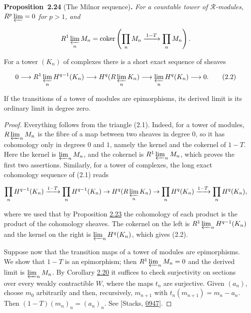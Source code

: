 \documentclass[11pt]{article}
\newenvironment{bpstatement}[2]{\par\addvspace{0.6\baselineskip}\noindent\textbf{#1}#2\textbf{.}\enspace\ignorespaces}
  {\par\addvspace{0.4\baselineskip}}
\newenvironment{bpstatementit}[2]{\begin{bpstatement}{#1}{#2}\itshape\ignorespaces}{\end{bpstatement}}
\providecommand{\coker}{}\renewcommand{\coker}{\operatorname{coker}}
\begin{document}
\label{bp69}%
\begin{bpstatementit}{Proposition~2.24}{ (The Milnor sequence)}
For a countable tower of \(\mathcal R\)-modules, \(R^p\varprojlim=0\) for \(p>1\), and

\[
R^1\varprojlim_n M_n
=\coker\left(\prod_n M_n\xrightarrow{\,1-T\,}\prod_n M_n\right).
\]

For a tower \((K_n)\) of complexes there is a short exact sequence of sheaves

\[
0\longrightarrow R^1\varprojlim_n H^{q-1}(K_n)
\longrightarrow H^q(R\varprojlim_nK_n)
\longrightarrow \varprojlim_n H^q(K_n)
\longrightarrow 0.
\tag{2.2}
\]

If the transitions of a tower of modules are epimorphisms, its derived limit is its ordinary limit in degree zero.
\end{bpstatementit}

\begin{proof}[{Proof}]\label{bp70}%
Everything follows from the triangle (2.1). Indeed, for a tower of modules, \(R\varprojlim_nM_n\) is the fibre of a map between two sheaves in degree \(0\), so it has cohomology only in degrees \(0\) and \(1\), namely the kernel and the cokernel of \(1-T\). Here the kernel is \(\varprojlim_nM_n\), and the cokernel is \(R^1\varprojlim_nM_n\), which proves the first two assertions. Similarly, for a tower of complexes, the long exact cohomology sequence of (2.1) reads

\[
\prod_nH^{q-1}(K_n)\xrightarrow{1-T}\prod_nH^{q-1}(K_n)
\to H^q(R\varprojlim_nK_n)\to\prod_nH^q(K_n)\xrightarrow{1-T}\prod_nH^q(K_n),
\]

where we used that by Proposition \hyperref[bp66]{2.23} the cohomology of each product is the product of the cohomology sheaves. The cokernel on the left is \(R^1\varprojlim_nH^{q-1}(K_n)\) and the kernel on the right is \(\varprojlim_nH^q(K_n)\), which gives (2.2).

Suppose now that the transition maps of a tower of modules are epimorphisms. We show that \(1-T\) is an epimorphism; then \(R^1\varprojlim_nM_n=0\) and the derived limit is \(\varprojlim_nM_n\). By Corollary \hyperref[bp57]{2.20} it suffices to check surjectivity on sections over every weakly contractible \(W\), where the maps \(t_n\) are surjective. Given \((a_n)\), choose \(m_0\) arbitrarily and then, recursively, \(m_{n+1}\) with \(t_n(m_{n+1})=m_n-a_n\). Then \((1-T)(m_n)_n=(a_n)_n\). See [Stacks, \href{https://stacks.math.columbia.edu/tag/0947}{0947}].
\end{proof}
\end{document}
